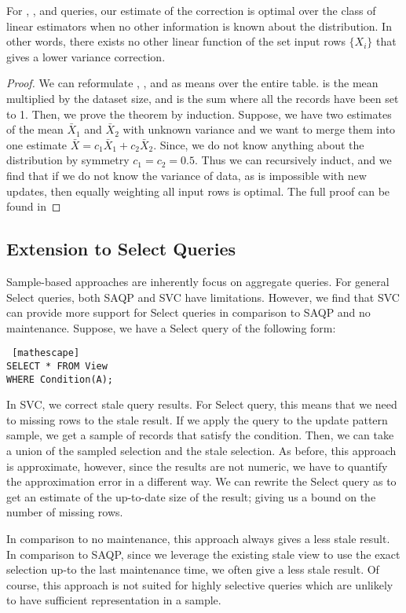 \begin{theorem}
For \sumfunc, \countfunc, and \avgfunc queries, our estimate of the correction is optimal over the class of linear estimators when no other information is known about the distribution. 
In other words, there exists no other linear function of the set input rows $\{ X_i \}$ that gives a lower variance correction.
\end{theorem}
\begin{proof}
We can reformulate \sumfunc, \countfunc, and \avgfunc as means over the entire table. \sumfunc is the mean multiplied by the dataset size, and \countfunc
is the sum where all the records have been set to 1. Then, we prove the theorem by induction. 
Suppose, we have two estimates of the mean $\bar{X}_1$ and $\bar{X}_2$ with unknown variance and we want to merge them into one estimate $\bar{X} = c_1\bar{X}_1+c_2\bar{X}_2$.
Since, we do not know anything about the distribution by symmetry $c_1 = c_2 = 0.5$. 
Thus we can recursively induct, and we find that if we do not know the variance of data, as is impossible with new updates, then equally weighting all input rows is optimal. 
The full proof can be found in 
\end{proof}

\subsection{Extension to Select Queries}
Sample-based approaches are inherently focus on aggregate queries.
For general Select queries, both SAQP and SVC have limitations.
However, we find that SVC can provide more support for Select queries in comparison to SAQP and no maintenance.
Suppose, we have a Select query of the following form:
\begin{lstlisting} [mathescape]
SELECT * FROM View 
WHERE Condition(A);
\end{lstlisting}
In SVC, we correct stale query results.
For Select query, this means that we need to missing rows to the stale result.
If we apply the query to the update pattern sample, we get a sample of records that satisfy the condition.
Then, we can take a union of the sampled selection and the stale selection.
As before, this approach is approximate, however, since the results are not numeric, we have to quantify the approximation error in a different way.
We can rewrite the Select query as \countfunc to get an estimate of the up-to-date size of the result; giving us a bound on 
the number of missing rows.

In comparison to no maintenance, this approach always gives a less stale result.
In comparison to SAQP, since we leverage the existing stale view to use the exact selection up-to the last maintenance time, we often give a less stale result.
Of course, this approach is not suited for highly selective queries which are unlikely to have sufficient representation in a sample.
